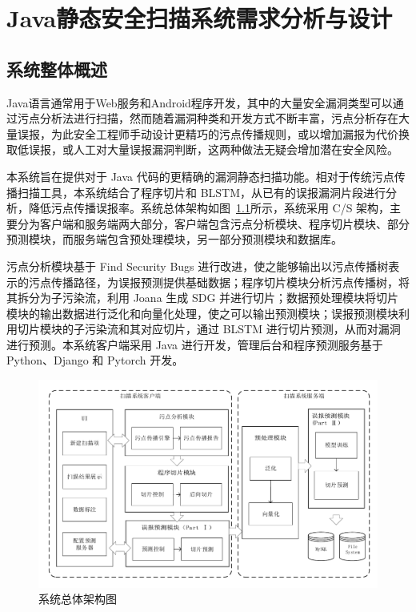 \chapter{Java静态安全扫描系统需求分析与设计}
\section{系统整体概述}
Java语言通常用于Web服务和Android程序开发，其中的大量安全漏洞类型可以通过污点分析法进行扫描，然而随着漏洞种类和开发方式不断丰富，污点分析存在大量误报，为此安全工程师手动设计更精巧的污点传播规则，或以增加漏报为代价换取低误报，或人工对大量误报漏洞判断，这两种做法无疑会增加潜在安全风险。

本系统旨在提供对于 Java 代码的更精确的漏洞静态扫描功能。相对于传统污点传播扫描工具，本系统结合了程序切片和 BLSTM，从已有的误报漏洞片段进行分析，降低污点传播误报率。系统总体架构如图~\ref{overview}所示，系统采用 C/S 架构，主要分为客户端和服务端两大部分，客户端包含污点分析模块、程序切片模块、部分预测模块，而服务端包含预处理模块，另一部分预测模块和数据库。

污点分析模块基于 Find Security Bugs 进行改进，使之能够输出以污点传播树表示的污点传播路径，为误报预测提供基础数据；程序切片模块分析污点传播树，将其拆分为子污染流，利用 Joana 生成 SDG 并进行切片；数据预处理模块将切片模块的输出数据进行泛化和向量化处理，使之可以输出预测模块；误报预测模块利用切片模块的子污染流和其对应切片，通过 BLSTM 进行切片预测，从而对漏洞进行预测。本系统客户端采用 Java 进行开发，管理后台和程序预测服务基于 Python、Django 和 Pytorch 开发。

\begin{figure}[htbp]
	\centering
	\includegraphics[width=5in]{FIGs/chapter3/system-architecture.pdf}
	\caption{系统总体架构图}\label{overview}
\end{figure}

